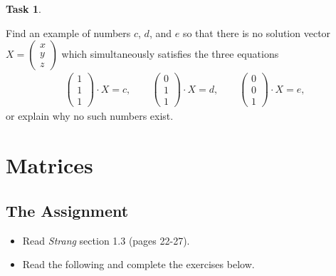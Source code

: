\documentclass[10pt,]{book}
\theoremstyle{plain}
\theoremstyle{definition}
\numberwithin{equation}{section}
\newtheorem{task}{Task}[chapter]
\begin{document}
\begin{task}
\label{task-22}

        Find an example of numbers \(c\), \(d\), and \(e\) so that there
        is no solution vector \(X = \left(\begin{smallmatrix}x\\y\\z
        \end{smallmatrix}\right)\) which simultaneously satisfies the three
        equations \begin{gather*}
\begin{pmatrix} 1\\1\\1\end{pmatrix}\cdot X = c, \qquad
          \begin{pmatrix} 0\\1\\1\end{pmatrix}\cdot X = d, \qquad
          \begin{pmatrix} 0\\0\\1\end{pmatrix}\cdot X = e,
\end{gather*}
          or explain why no such numbers exist.
      \end{task}
\clearpage
\typeout{************************************************}
\typeout{************************************************}
\section[Matrices]{Matrices}\label{matrices}
\typeout{************************************************}
\typeout{************************************************}
\subsection[The Assignment]{The Assignment}\label{subsection-10}
\begin{itemize}
\item{}Read \emph{Strang} section 1.3 (pages 22-27).\item{}Read the following and complete the exercises below.\end{itemize}
\typeout{************************************************}
\typeout{************************************************}
\end{document}
